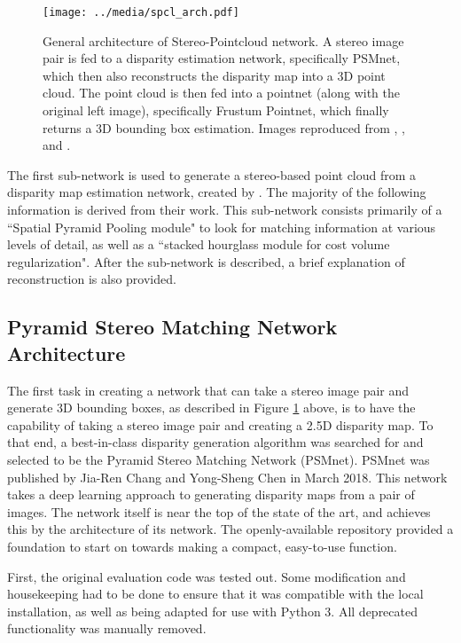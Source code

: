 \begin{figure}[ht]
	\centering
	\texttt{[image: ../media/spcl\_arch.pdf]}
	\caption{General architecture of Stereo-Pointcloud network. A stereo image pair is fed to a disparity estimation network, specifically PSMnet, which then also reconstructs the disparity map into a 3D point cloud. The point cloud is then fed into a pointnet (along with the original left image), specifically Frustum Pointnet, which finally returns a 3D bounding box estimation. Images reproduced from \cite{geiger_are_2012}, \cite{chang_pyramid_2018}, and \cite{qi_frustum_2017}.}
	\label{spcl_arch}
\end{figure}

The first sub-network is used to generate a stereo-based point cloud from a disparity map estimation network, created by \cite{chang_pyramid_2018}. The majority of the following information is derived from their work. This sub-network consists primarily of a ``Spatial Pyramid Pooling module" to look for matching information at various levels of detail, as well as a ``stacked hourglass module for cost volume regularization". After the sub-network is described, a brief explanation of reconstruction is also provided. 

\subsection{Pyramid Stereo Matching Network Architecture}
The first task in creating a network that can take a stereo image pair and generate 3D bounding boxes, as described in Figure \ref{spcl_arch} above, is to have the capability of taking a stereo image pair and creating a 2.5D disparity map. To that end, a best-in-class disparity generation algorithm was searched for and selected to be the Pyramid Stereo Matching Network (PSMnet). PSMnet was published by Jia-Ren Chang and Yong-Sheng Chen in March 2018. This network takes a deep learning approach to generating disparity maps from a pair of images. The network itself is near the top of the state of the art, and achieves this by the architecture of its network. The openly-available repository provided a foundation to start on towards making a compact, easy-to-use function.

First, the original evaluation code was tested out. Some modification and housekeeping had to be done to ensure that it was compatible with the local installation, as well as being adapted for use with Python 3. All deprecated functionality was manually removed.

